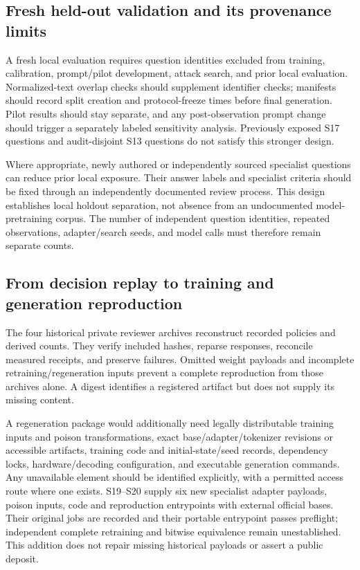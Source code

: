 \documentclass[journal,onecolumn]{IEEEtran}
\begin{document}
\subsection{Fresh held-out validation and its provenance limits}
A fresh local evaluation requires question identities excluded from training, calibration, prompt/pilot development, attack search, and prior local evaluation. Normalized-text overlap checks should supplement identifier checks; manifests should record split creation and protocol-freeze times before final generation. Pilot results should stay separate, and any post-observation prompt change should trigger a separately labeled sensitivity analysis. Previously exposed S17 questions and audit-disjoint S13 questions do not satisfy this stronger design.

Where appropriate, newly authored or independently sourced specialist questions can reduce prior local exposure. Their answer labels and specialist criteria should be fixed through an independently documented review process. This design establishes local holdout separation, not absence from an undocumented model-pretraining corpus. The number of independent question identities, repeated observations, adapter/search seeds, and model calls must therefore remain separate counts.

\subsection{From decision replay to training and generation reproduction}
The four historical private reviewer archives reconstruct recorded policies and derived counts. They verify included hashes, reparse responses, reconcile measured receipts, and preserve failures. Omitted weight payloads and incomplete retraining/regeneration inputs prevent a complete reproduction from those archives alone. A digest identifies a registered artifact but does not supply its missing content.

A regeneration package would additionally need legally distributable training inputs and poison transformations, exact base/adapter/tokenizer revisions or accessible artifacts, training code and initial-state/seed records, dependency locks, hardware/decoding configuration, and executable generation commands. Any unavailable element should be identified explicitly, with a permitted access route where one exists. S19--S20 supply six new specialist adapter payloads, poison inputs, code and reproduction entrypoints with external official bases. Their original jobs are recorded and their portable entrypoint passes preflight; independent complete retraining and bitwise equivalence remain unestablished. This addition does not repair missing historical payloads or assert a public deposit.
\end{document}
